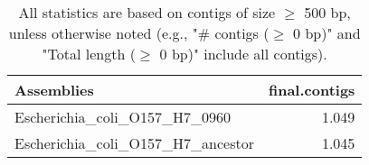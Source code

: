 \documentclass[12pt,a4paper]{article}
\begin{document}
\begin{table}[ht]
\begin{center}
\caption{All statistics are based on contigs of size $\geq$ 500 bp, unless otherwise noted (e.g., "\# contigs ($\geq$ 0 bp)" and "Total length ($\geq$ 0 bp)" include all contigs).}
\begin{tabular}{|l*{1}{|r}|}
\hline
Assemblies & final.contigs \\ \hline
Escherichia\_coli\_O157\_H7\_0960 & 1.049 \\ \hline
Escherichia\_coli\_O157\_H7\_ancestor & 1.045 \\ \hline
\end{tabular}
\end{center}
\end{table}
\end{document}
